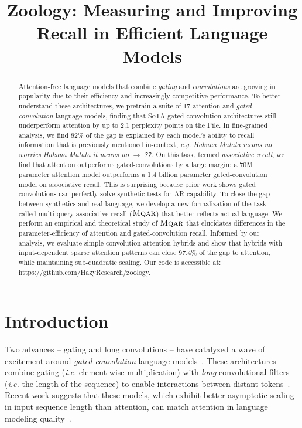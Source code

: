 \title{Zoology: Measuring and Improving Recall in Efficient Language Models}

\begin{abstract}
Attention-free language models that combine \textit{gating} and \textit{convolutions} are growing in popularity due to their efficiency and increasingly competitive performance. To better understand these architectures, we pretrain a suite of 17 attention and \textit{gated-convolution} language models, finding that SoTA gated-convolution architectures still underperform attention by up to 2.1 perplexity points on the Pile. In fine-grained analysis, we find 82\% of the gap is explained by each model's ability to recall information that is previously mentioned in-context, \textit{e.g.} \textit{Hakuna Matata means no worries Hakuna Matata it means no $\rightarrow$ \texttt{??}}.
On this task, termed \textit{associative recall}, we find that attention outperforms gated-convolutions by a large margin: a 70M parameter attention model outperforms a 1.4 billion parameter gated-convolution model on associative recall. This is surprising because prior work shows gated convolutions can perfectly solve synthetic tests for AR capability. To close the gap between synthetics and real language, we develop a new formalization of the task called multi-query associative recall (${\textsc{Mqar}}$) that better reflects actual language. We perform an empirical and theoretical study of ${\textsc{Mqar}}$ that elucidates differences in the parameter-efficiency of attention and gated-convolution recall. Informed by our analysis, we evaluate simple convolution-attention hybrids and show that hybrids with input-dependent sparse attention patterns can close 97.4\% of the gap to attention, while maintaining sub-quadratic scaling. Our code is accessible at: \url{https://github.com/HazyResearch/zoology}.
\end{abstract}

\section{Introduction}

Two advances -- gating and long convolutions -- have catalyzed a wave of excitement around \textit{gated-convolution} language models~\citep[inter alia.]{dao2022hungry, ma2022mega, wang2022pretraining,poli2023hyena}. These architectures combine gating (\textit{i.e.} element-wise multiplication) with \textit{long} convolutional filters (\textit{i.e.} the length of the sequence) to enable interactions between distant tokens~\citep{dauphin2017language,gu2021efficiently}. Recent work suggests that these models, which exhibit better asymptotic scaling in input sequence length than attention, can match attention in language modeling quality~\citep{poli2023hyena, peng2023rwkv, fu2023monarch}. 

